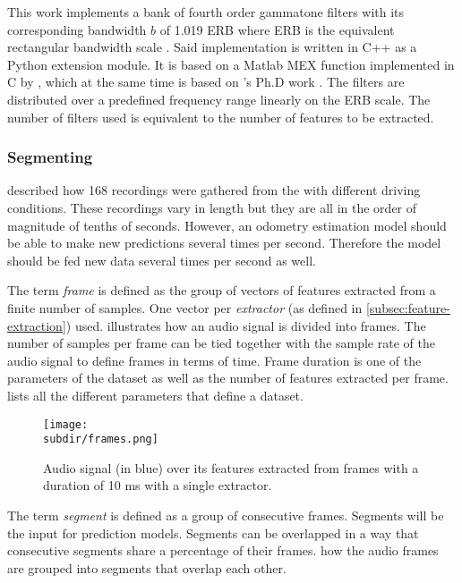 This work implements a bank of fourth order gammatone filters with its
corresponding bandwidth $b$ of 1.019 ERB where ERB is the equivalent
rectangular bandwidth scale \cite{GLASBERG1990103}. Said implementation is
written in C++ as a Python extension module. It is based on a Matlab MEX
function implemented in C by \citeauthor{CorrelogramMa2007}
\cite{CorrelogramMa2007}, which at the same time is based on
\citeauthor{Cooke1993ModellingAP}'s Ph.D work \cite{Cooke1993ModellingAP}. The
filters are distributed over a predefined frequency range linearly on the ERB
scale. The number of filters used is equivalent to the number of features to be
extracted. 

\subsubsection{Segmenting} \label{subsec:segments}

 described how 168 recordings were gathered from
the  with different driving
conditions. These recordings vary in length but they are all in the order of
magnitude of tenths of seconds. However, an odometry estimation model should be
able to make new predictions several times per second. Therefore the model
should be fed new data several times per second as well. 

The term \emph{frame} is defined as the group of vectors of features extracted
from a finite number of samples. One vector per \emph{extractor} (as defined in
\cref{subsec:feature-extraction}) used.  illustrates
how an audio signal is divided into frames. The number of samples per frame can
be tied together with the sample rate of the audio signal to define frames in
terms of time. Frame duration is one of the parameters of the dataset as well
as the number of features extracted per frame. 
lists all the different parameters that define a dataset.

\begin{figure}
    \centering
    \texttt{[image: \\subdir/frames.png]}
    \caption[Audio frames]{Audio signal (in {\color{blue} blue}) over its
        features extracted from frames with a duration of 10 ms with a single
         extractor.}
    \label{fig:datasets-frames}
\end{figure}

The term \emph{segment} is defined as a group of consecutive frames. Segments
will be the input for prediction models. Segments can be overlapped in a way
that consecutive segments share a percentage of their frames.
 how the audio frames are grouped into segments
that overlap each other.

